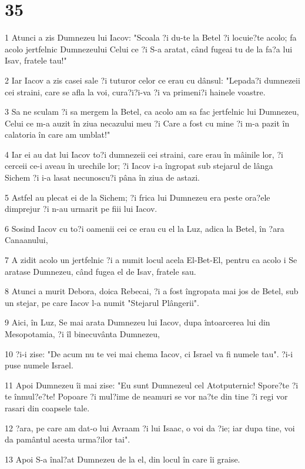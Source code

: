 \chapter{35}

\par 1 Atunci a zis Dumnezeu lui Iacov: "Scoala ?i du-te la Betel ?i locuie?te acolo; fa acolo jertfelnic Dumnezeului Celui ce ?i S-a aratat, când fugeai tu de la fa?a lui Isav, fratele tau!"
\par 2 Iar Iacov a zis casei sale ?i tuturor celor ce erau cu dânsul: "Lepada?i dumnezeii cei straini, care se afla la voi, cura?i?i-va ?i va primeni?i hainele voastre.
\par 3 Sa ne sculam ?i sa mergem la Betel, ca acolo am sa fac jertfelnic lui Dumnezeu, Celui ce m-a auzit în ziua necazului meu ?i Care a fost cu mine ?i m-a pazit în calatoria în care am umblat!"
\par 4 Iar ei au dat lui Iacov to?i dumnezeii cei straini, care erau în mâinile lor, ?i cerceii ce-i aveau în urechile lor; ?i Iacov i-a îngropat sub stejarul de lânga Sichem ?i i-a lasat necunoscu?i pâna în ziua de astazi.
\par 5 Astfel au plecat ei de la Sichem; ?i frica lui Dumnezeu era peste ora?ele dimprejur ?i n-au urmarit pe fiii lui Iacov.
\par 6 Sosind Iacov cu to?i oamenii cei ce erau cu el la Luz, adica la Betel, în ?ara Canaanului,
\par 7 A zidit acolo un jertfelnic ?i a numit locul acela El-Bet-El, pentru ca acolo i Se aratase Dumnezeu, când fugea el de Isav, fratele sau.
\par 8 Atunci a murit Debora, doica Rebecai, ?i a fost îngropata mai jos de Betel, sub un stejar, pe care Iacov l-a numit "Stejarul Plângerii".
\par 9 Aici, în Luz, Se mai arata Dumnezeu lui Iacov, dupa întoarcerea lui din Mesopotamia, ?i îl binecuvânta Dumnezeu,
\par 10 ?i-i zise: "De acum nu te vei mai chema Iacov, ci Israel va fi numele tau". ?i-i puse numele Israel.
\par 11 Apoi Dumnezeu îi mai zise: "Eu sunt Dumnezeul cel Atotputernic! Spore?te ?i te înmul?e?te! Popoare ?i mul?ime de neamuri se vor na?te din tine ?i regi vor rasari din coapsele tale.
\par 12 ?ara, pe care am dat-o lui Avraam ?i lui Isaac, o voi da ?ie; iar dupa tine, voi da pamântul acesta urma?ilor tai".
\par 13 Apoi S-a înal?at Dumnezeu de la el, din locul în care îi graise.
